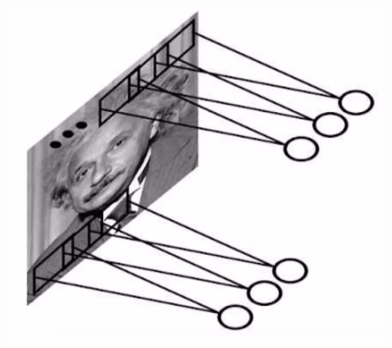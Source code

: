 \documentclass[default, aspectratio=169]{beamer}
\begin{document}
\begin{frame}
\begin{minipage}{0.4\textwidth}
		\includegraphics[keepaspectratio, scale=0.4]{pic/CNn.png}
	\end{minipage}
\end{frame}
\end{document}
